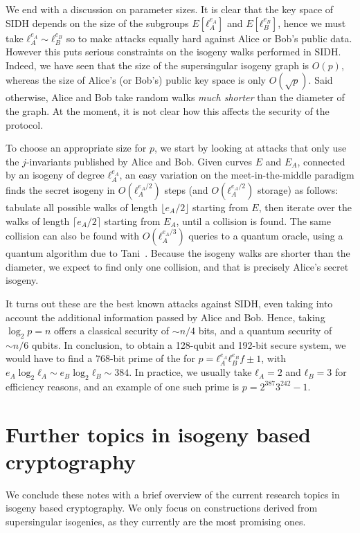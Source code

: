 \documentclass[10pt]{article}
\theoremstyle{plain}
\theoremstyle{definition}
\begin{document}
We end with a discussion on parameter sizes. %
It is clear that the key space of SIDH depends on the size of the
subgroups $E[ℓ_A^{e_A}]$ and $E[ℓ_B^{e_B}]$, hence we must take
$ℓ_A^{e_A}\sim ℓ_B^{e_B}$ so to make attacks equally hard against
Alice or Bob's public data. %
However this puts serious constraints on the isogeny walks performed
in SIDH. %
Indeed, we have seen that the size of the supersingular isogeny graph
is $O(p)$, whereas the size of Alice's (or Bob's) public key space is
only $O(\sqrt{p})$. %
Said otherwise, Alice and Bob take random walks \emph{much shorter}
than the diameter of the graph. %
At the moment, it is not clear how this affects the security of the
protocol.

To choose an appropriate size for $p$, we start by looking at attacks
that only use the $j$-invariants published by Alice and Bob. %
Given curves $E$ and $E_A$, connected by an isogeny of degree
$ℓ_A^{e_A}$, an easy variation on the meet-in-the-middle paradigm
finds the secret isogeny in $O(ℓ_A^{e_A/2})$ steps (and
$O(ℓ_A^{e_A/2})$ storage) as follows: tabulate all possible walks of
length $\lfloor e_A/2\rfloor$ starting from $E$, then iterate over the
walks of length $\lceil e_A/2\rceil$ starting from $E_A$, until a
collision is found. %
The same collision can also be found with $O(ℓ_A^{e_A/3})$ queries to
a quantum oracle, using a quantum algorithm due to
Tani~\cite{tani2009claw}. %
Because the isogeny walks are shorter than the diameter, we expect to
find only one collision, and that is precisely Alice's secret isogeny.

It turns out these are the best known attacks against SIDH, even
taking into account the additional information passed by Alice and
Bob. %
Hence, taking $\log_2p=n$ offers a classical security of $\sim n/4$
bits, and a quantum security of $\sim n/6$ qubits. %
In conclusion, to obtain a 128-qubit and 192-bit secure system, we
would have to find a 768-bit prime of the for
$p=ℓ_A^{e_A}ℓ_B^{e_B}f±1$, with $e_A\log_2ℓ_A\sim e_B\log_2ℓ_B\sim384$. %
In practice, we usually take $ℓ_A=2$ and $ℓ_B=3$ for efficiency
reasons, and an example of one such prime is $p=2^{387}3^{242}-1$.


\section{Further topics in isogeny based cryptography}

We conclude these notes with a brief overview of the current research
topics in isogeny based cryptography. %
We only focus on constructions derived from supersingular isogenies,
as they currently are the most promising ones.
\end{document}
